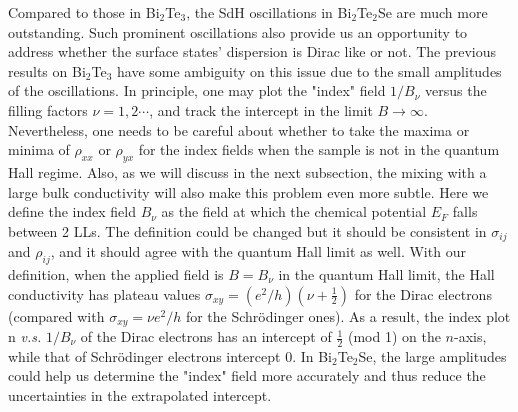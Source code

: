 Compared to those in Bi$_2$Te$_3$, the SdH oscillations in Bi$_2$Te$_2$Se are much more outstanding. Such prominent oscillations also provide us an opportunity to address whether the surface states' dispersion is Dirac like or not. The previous results on Bi$_2$Te$_3$ have some ambiguity on this issue due to the small amplitudes of the oscillations. In principle, one may plot the
"index" field $1/B_{\nu}$ versus the filling factors $\nu = 1,2 \cdots$, and track the intercept in the limit $B\to\infty$.  Nevertheless, one needs to be careful about whether to take the maxima or minima of $\rho_{xx}$ or $\rho_{yx}$ for the index fields when the sample is not in the quantum Hall regime. Also, as we will discuss in the next subsection, the mixing with a large bulk conductivity will also make this problem even more subtle.  Here we define the index field $B_{\nu}$ as the field at which the chemical potential $E_F$ falls between 2 LLs. The definition could be changed but it should be consistent in $\sigma_{ij}$ and $\rho_{ij}$, and it should agree with the quantum Hall limit as well. With our definition, when the applied field is $B=B_{\nu}$ in the quantum Hall limit, the Hall conductivity has plateau values $\sigma_{xy} = (e^2/h)(\nu+\frac12)$ for the Dirac electrons (compared with $\sigma_{xy} = \nu e^2/h$ for the Schr\"{o}dinger ones). As a result, the index plot n \emph{v.s.} $1/B_{\nu}$ of the Dirac electrons has an intercept of $\frac{1}{2}$ (mod 1) on the $n$-axis, while that of Schr\"{o}dinger electrons intercept 0. In Bi$_2$Te$_2$Se, the large amplitudes could help us determine the "index" field more accurately and thus reduce the uncertainties in the extrapolated intercept.






